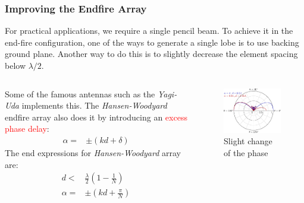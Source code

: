 \documentclass[10pt]{beamer}
\begin{document}
\begin{frame}
    \frametitle{Improving the Endfire Array}
For practical applications, we require a single pencil beam. To achieve it in the end-fire configuration, one of the ways to generate a single lobe is to use backing ground plane. Another way to do this is to slightly decrease the element spacing below $\lambda/2$.

\begin{columns}[T] %
    \begin{column}{.7\textwidth}
Some of the famous antennas such as the \textit{Yagi-Uda} implements this. The \textit{Hansen-Woodyard} endfire array also does it by introducing an \textcolor{red}{excess phase delay}:
\small
\begin{align*}
    \alpha {}=& \pm \left(k d + \delta \right)
\end{align*}
The end expressions for \textit{Hansen-Woodyard} array are:
\begin{align*}
    d {}<& \frac{\lambda}{2} \left(1 - \frac{1}{N}\right) \\
    \alpha {}=& \pm \left( k d + \frac{\pi }{N}\right)
\end{align*}
    \end{column}
    \begin{column}{.4\textwidth}
        \begin{figure}[t!]
            \centering
            \includegraphics[width=.95\textwidth]{endfire_two.pdf}
            \caption{Slight change of the phase}
          \end{figure}
    \end{column}%
\end{columns}
\end{frame}
\end{document}
